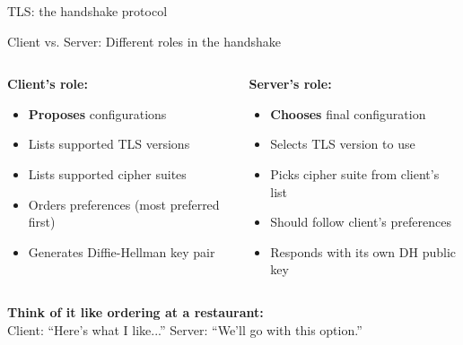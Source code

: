 \documentclass[aspectratio=169, lualatex, handout]{beamer}
\begin{document}
\begin{frame}{TLS: the handshake protocol}
\end{frame}

\begin{frame}{Client vs. Server: Different roles in the handshake}
	\begin{columns}[c]
		\begin{column}{0.5\textwidth}
			\textbf{Client's role:}
			\begin{itemize}[<+->]
				\item \textbf{Proposes} configurations
				\item Lists supported TLS versions
				\item Lists supported cipher suites
				\item Orders preferences (most preferred first)
				\item Generates Diffie-Hellman key pair
			\end{itemize}
		\end{column}
		\begin{column}{0.5\textwidth}
			\textbf{Server's role:}
			\begin{itemize}[<+->]
				\item \textbf{Chooses} final configuration
				\item Selects TLS version to use
				\item Picks cipher suite from client's list
				\item Should follow client's preferences
				\item Responds with its own DH public key
			\end{itemize}
		\end{column}
	\end{columns}
	\pause
	\begin{center}
		\textbf{Think of it like ordering at a restaurant:}\\
		Client: ``Here's what I like...'' \quad Server: ``We'll go with this option.''
	\end{center}
\end{frame}
\end{document}
